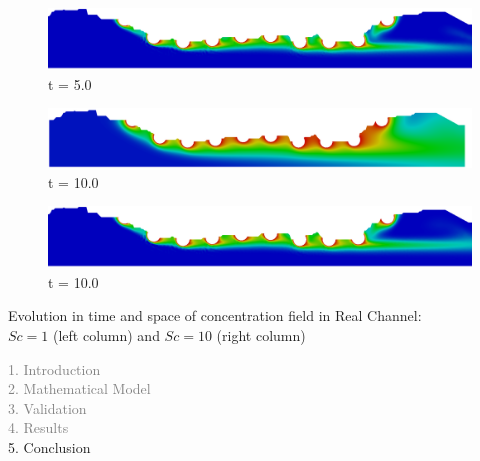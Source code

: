 \begin{frame}
\begin{figure}
\begin{minipage}{.50\linewidth}
     \medskip
      \centering
      \includegraphics[scale=0.075]{images/conc10_RealStrut25000.png}\\
      \tiny t = 5.0
     \end{minipage}
     \begin{minipage}{.50\linewidth}
      \centering
      \includegraphics[scale=0.075]{images/conc1_RealStrut20000.png}\\
      \tiny t = 10.0
     \end{minipage}%
     \begin{minipage}{.50\linewidth}
      \centering
      \includegraphics[scale=0.075]{images/conc10_RealStrut50000.png}\\
      \tiny t = 10.0
     \end{minipage}
\end{figure}
\vspace{-0.2cm}
\centering \scriptsize Evolution in time and space of concentration field in Real Channel:\\
                 $Sc=1$ (left column) and $Sc=10$ (right column)
\end{frame}
\fi


\begin{frame}
  \vspace{-1cm}
  \textcolor{gray}{1. Introduction}\\[0.1cm]
  \textcolor{gray}{2. Mathematical Model}\\[0.1cm]
  \textcolor{gray}{3. Validation}\\[0.1cm]
  \textcolor{gray}{4. Results}\\[0.1cm]
  5. Conclusion
\end{frame}

